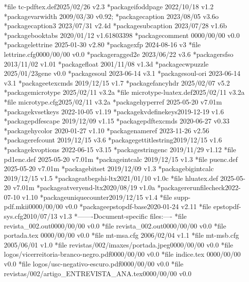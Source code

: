 {  *{file}   {tc-pdftex.def}{2025/02/26 v2.3}
  *{package}{ifoddpage}   {2022/10/18 v1.2}
  *{package}{varwidth}    {2009/03/30 v0.92;}
  *{package}{caption}     {2023/08/05 v3.6o}
  *{package}{caption3}    {2023/07/31 v2.4d}
  *{package}{subcaption}  {2023/07/28 v1.6b}
  *{package}{booktabs}    {2020/01/12 v1.61803398}
  *{package}{comment}     {0000/00/00 v0.0}
  *{package}{lettrine}    {2025-01-30 v2.80}
  *{package}{xfp}         {2024-08-16 v3}
  *{file}   {lettrine.cfg}{0000/00/00 v0.0}
  *{package}{ragged2e}    {2023/06/22 v3.6}
  *{package}{rsfso}       {2013/11/02 v1.01}
  *{package}{float}       {2001/11/08 v1.3d}
  *{package}{cwpuzzle}    {2025/01/23gene v0.0}
  *{package}{soul}        {2023-06-14 v3.1}
  *{package}{soul-ori}    {2023-06-14 v3.1}
  *{package}{etexcmds}    {2019/12/15 v1.7}
  *{package}{fancyhdr}    {2025/02/07 v5.2}
  *{package}{microtype}   {2025/02/11 v3.2a}
  *{file}   {microtype-luatex.def}{2025/02/11 v3.2a}
  *{file}   {microtype.cfg}{2025/02/11 v3.2a}
  *{package}{hyperref}    {2025-05-20 v7.01m}
  *{package}{kvsetkeys}   {2022-10-05 v1.19}
  *{package}{kvdefinekeys}{2019-12-19 v1.6}
  *{package}{pdfescape}   {2019/12/09 v1.15}
  *{package}{pdftexcmds}  {2020-06-27 v0.33}
  *{package}{hycolor}     {2020-01-27 v1.10}
  *{package}{nameref}     {2023-11-26 v2.56}
  *{package}{refcount}    {2019/12/15 v3.6}
  *{package}{gettitlestring}{2019/12/15 v1.6}
  *{package}{kvoptions}   {2022-06-15 v3.15}
  *{package}{stringenc}   {2019/11/29 v1.12}
  *{file}   {pd1enc.def}  {2025-05-20 v7.01m}
  *{package}{intcalc}     {2019/12/15 v1.3}
  *{file}   {puenc.def}   {2025-05-20 v7.01m}
  *{package}{bitset}      {2019/12/09 v1.3}
  *{package}{bigintcalc}  {2019/12/15 v1.5}
  *{package}{atbegshi-ltx}{2021/01/10 v1.0c}
  *{file}   {hluatex.def} {2025-05-20 v7.01m}
  *{package}{atveryend-ltx}{2020/08/19 v1.0a}
  *{package}{rerunfilecheck}{2022-07-10 v1.10}
  *{package}{uniquecounter}{2019/12/15 v1.4}
  *{file}   {supp-pdf.mkii}{0000/00/00 v0.0}
  *{package}{epstopdf-base}{2020-01-24 v2.11}
  *{file}   {epstopdf-sys.cfg}{2010/07/13 v1.3}
  *{-------}{Document-specific files:}{----}
  *{file}   {revista_002.out}{0000/00/00 v0.0}
  *{file}   {revista_002.out}{0000/00/00 v0.0}
  *{file}   {portada.tex} {0000/00/00 v0.0}
  *{file}   {mt-msa.cfg}  {2006/02/04 v1.1}
  *{file}   {mt-msb.cfg}  {2005/06/01 v1.0}
  *{file}   {revistas/002/imaxes/portada.jpeg}{0000/00/00 v0.0}
  *{file}   {logos/vicerreitoria-branco-negro.pdf}{0000/00/00 v0.0}
  *{file}   {indice.tex}  {0000/00/00 v0.0}
  *{file}   {logos/usc-negativo-escuro.pdf}{0000/00/00 v0.0}
  *{file}   {revistas/002/artigo_ENTREVISTA_ANA.tex}{0000/00/00 v0.0}
}
